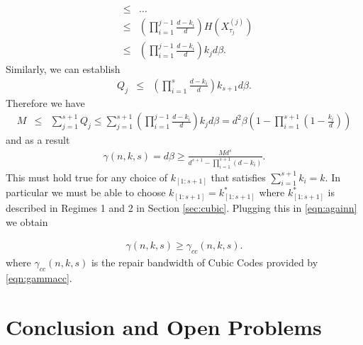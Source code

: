 \documentclass[journal,onecolumn,draftcls]{IEEEtran}
\begin{document}
\begin{IEEEproof}
\begin{eqnarray*}
&\le&\dots\\
&\le& \left(\prod_{i = 1}^{j-1} \frac{d-k_i}{d}\right) H(X^{(j)}_{\tau_j})\\
&\le& \left(\prod_{i = 1}^{j-1} \frac{d-k_i}{d}\right) k_jd\beta.
\end{eqnarray*}
Similarly, we can establish 
\begin{eqnarray*}
Q_j &\le& \left(\prod_{i = 1}^{s} \frac{d-k_i}{d}\right) k_{s+1}d\beta.
\end{eqnarray*}
Therefore we have
\begin{eqnarray*}
M&\le& \sum_{j = 1}^{s+1} Q_j \le \sum_{j = 1}^{s+1}  \left(\prod_{i = 1}^{j-1} \frac{d-k_i}{d}\right) k_jd\beta= d^2\beta\left(1 - \prod_{i = 1}^{s+1} (1 - \frac{k_i}{d})\right)
\end{eqnarray*}
and as a result
\begin{eqnarray}
\gamma(n,k,s) = d\beta \ge \frac{Md^s}{d^{s+ 1} - \prod_{i = 1}^{s+1}(d-k_i)}.
\label{eqn:againn}
\end{eqnarray}
This must hold true for any choice of $k_{[1:s+1]}$ that satisfies $\sum_{i = 1}^{s+1}{k_i} = k$. In particular we must be able to choose $k_{[1:s+1]} = k^*_{[1:s+1]}$ where $k^*_{[1:s+1]}$ is described in Regimes 1 and 2 in Section \ref{sec:cubic}. Plugging this in \eqref{eqn:againn} we obtain 

\begin{eqnarray}
\gamma(n,k,s)\ge \gamma_{cc}(n,k,s).
\end{eqnarray}
where $\gamma_{cc}(n,k,s)$ is the repair bandwidth of Cubic Codes provided by \eqref{eqn:gammacc}.
\end{IEEEproof}

\section{Conclusion and Open Problems}
\end{document}
